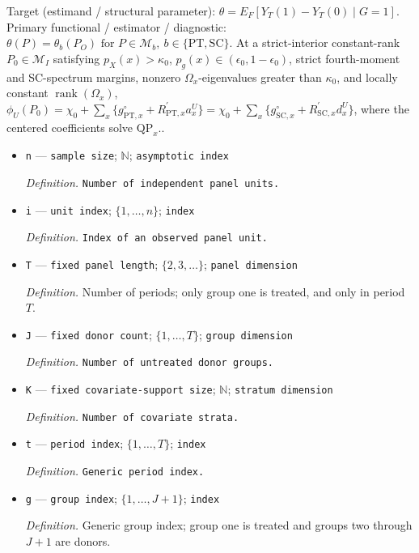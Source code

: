 \documentclass{article}
\begin{document}
Target (estimand / structural parameter): \(\theta=E_F[Y_T(1)-Y_T(0)\mid G=1]\).
Primary functional / estimator / diagnostic: \(\theta(P)=\theta_b(P_O)\text{ for }P\in\mathcal M_b,\ b\in\{\mathrm{PT},\mathrm{SC}\}\). At a strict-interior constant-rank \(P_0\in\mathcal M_I\) satisfying \(p_X(x)>\kappa_0\), \(p_g(x)\in(\epsilon_0,1-\epsilon_0)\), strict fourth-moment and SC-spectrum margins, nonzero \(\Omega_x\)-eigenvalues greater than \(\kappa_0\), and locally constant \(\operatorname{rank}(\Omega_x)\), \(\phi_U(P_0)=\chi_0+\sum_x\{g^{\circ}_{\mathrm{PT},x}+R_{\mathrm{PT},x}^{\prime}a_x^U\}=\chi_0+\sum_x\{g^{\circ}_{\mathrm{SC},x}+R_{\mathrm{SC},x}^{\prime}d_x^U\}\), where the centered coefficients solve \(\mathrm{QP}_x\)..
\begin{itemize}
  \item \texttt{n} --- \texttt{sample size}; \(\mathbb N\); \texttt{asymptotic index}
  \par\smallskip\noindent\emph{Definition.} \texttt{Number of independent panel units.}
  \item \texttt{i} --- \texttt{unit index}; \(\{1,\ldots,n\}\); \texttt{index}
  \par\smallskip\noindent\emph{Definition.} \texttt{Index of an observed panel unit.}
  \item \texttt{T} --- \texttt{fixed panel length}; \(\{2,3,\ldots\}\); \texttt{panel dimension}
  \par\smallskip\noindent\emph{Definition.} Number of periods; only group one is treated, and only in period \(T\).
  \item \texttt{J} --- \texttt{fixed donor count}; \(\{1,\ldots,T\}\); \texttt{group dimension}
  \par\smallskip\noindent\emph{Definition.} \texttt{Number of untreated donor groups.}
  \item \texttt{K} --- \texttt{fixed covariate-\allowbreak{}support size}; \(\mathbb N\); \texttt{stratum dimension}
  \par\smallskip\noindent\emph{Definition.} \texttt{Number of covariate strata.}
  \item \texttt{t} --- \texttt{period index}; \(\{1,\ldots,T\}\); \texttt{index}
  \par\smallskip\noindent\emph{Definition.} \texttt{Generic period index.}
  \item \texttt{g} --- \texttt{group index}; \(\{1,\ldots,J+1\}\); \texttt{index}
  \par\smallskip\noindent\emph{Definition.} Generic group index; group one is treated and groups two through \(J+1\) are donors.

\end{itemize}
\end{document}
